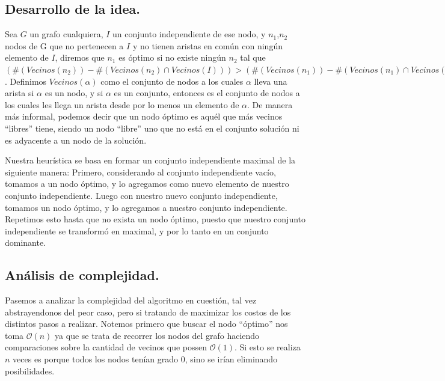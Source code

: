 \subsection{Desarrollo de la idea.}

\vspace*{0.3cm}

Sea $G$ un grafo cualquiera, $I$ un conjunto independiente de ese nodo, y $n_{1}$,$n_{2}$ nodos de G que no pertenecen a $I$ y no tienen aristas en común con ningún elemento de $I$, diremos que $n_{1}$ es óptimo si no existe ningún $n_{2}$ tal que $( \# (Vecinos(n_{2})) - \# (Vecinos(n_{2}) \cap Vecinos(I))) > ( \# (Vecinos(n_{1})) - \# (Vecinos(n_{1}) \cap Vecinos(I)))$. Definimos $Vecinos(\alpha)$ como el conjunto de nodos a los cuales $\alpha$ lleva una arista si $\alpha$ es un nodo, y si $\alpha$ es un conjunto, entonces es el conjunto de nodos a los cuales les llega un arista desde por lo menos un elemento de $\alpha$.  De manera más informal, podemos decir que un nodo óptimo es aquél que más vecinos ``libres'' tiene, siendo un nodo ``libre'' uno que no está en el conjunto solución ni es adyacente a un nodo de la solución.

Nuestra heurística se basa en formar un conjunto independiente maximal de la siguiente manera:
Primero, considerando al conjunto independiente vacío, tomamos a un nodo óptimo, y lo agregamos como nuevo elemento de nuestro conjunto independiente. Luego con nuestro nuevo conjunto independiente, tomamos un nodo óptimo, y lo agregamos a nuestro conjunto independiente. Repetimos esto hasta que no exista un nodo óptimo, puesto que nuestro conjunto independiente se transformó en maximal, y por lo tanto en un conjunto dominante.
 
\vspace*{0.6cm}


\subsection{Análisis de complejidad.}

\vspace*{0.3cm}

Pasemos a analizar la complejidad del algoritmo en cuestión, tal vez abstrayendonos del peor caso, pero si tratando de maximizar los costos de los distintos pasos a realizar. Notemos primero que buscar el nodo ``óptimo'' nos toma $\mathcal{O}(n)$ ya que se trata de recorrer los nodos del grafo haciendo comparaciones sobre la cantidad de vecinos que possen $\mathcal{O}(1)$. Si esto se realiza $n$ veces es porque todos los nodos tenían grado 0, sino se irían eliminando posibilidades.

